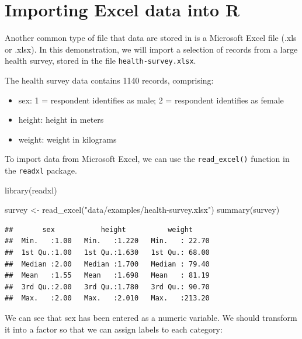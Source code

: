 \documentclass[
]{memoir}
\newenvironment{Shaded}{\begin{snugshade}}{\end{snugshade}}
\newcommand{\AttributeTok}[1]{\textcolor[rgb]{0.77,0.63,0.00}{#1}}
\newcommand{\DecValTok}[1]{\textcolor[rgb]{0.00,0.00,0.81}{#1}}
\newcommand{\FunctionTok}[1]{\textcolor[rgb]{0.00,0.00,0.00}{#1}}
\newcommand{\NormalTok}[1]{#1}
\newcommand{\OtherTok}[1]{\textcolor[rgb]{0.56,0.35,0.01}{#1}}
\newcommand{\SpecialCharTok}[1]{\textcolor[rgb]{0.00,0.00,0.00}{#1}}
\newcommand{\StringTok}[1]{\textcolor[rgb]{0.31,0.60,0.02}{#1}}
\providecommand{\tightlist}{%
  \setlength{\itemsep}{0pt}\setlength{\parskip}{0pt}}
\begin{document}
\hypertarget{import-excel}{%
\section{Importing Excel data into R}\label{import-excel}}

Another common type of file that data are stored in is a Microsoft Excel file (.xls or .xlsx). In this demonstration, we will import a selection of records from a large health survey, stored in the file \texttt{health-survey.xlsx}.

The health survey data contains 1140 records, comprising:

\begin{itemize}
\tightlist
\item
  sex: 1 = respondent identifies as male; 2 = respondent identifies as female
\item
  height: height in meters
\item
  weight: weight in kilograms
\end{itemize}

To import data from Microsoft Excel, we can use the \texttt{read\_excel()} function in the \texttt{readxl} package.

\begin{Shaded}
\begin{Highlighting}[]
\FunctionTok{library}\NormalTok{(readxl)}

\NormalTok{survey }\OtherTok{\textless{}{-}} \FunctionTok{read\_excel}\NormalTok{(}\StringTok{"data/examples/health{-}survey.xlsx"}\NormalTok{)}
\FunctionTok{summary}\NormalTok{(survey)}
\end{Highlighting}
\end{Shaded}

\begin{verbatim}
##       sex           height          weight      
##  Min.   :1.00   Min.   :1.220   Min.   : 22.70  
##  1st Qu.:1.00   1st Qu.:1.630   1st Qu.: 68.00  
##  Median :2.00   Median :1.700   Median : 79.40  
##  Mean   :1.55   Mean   :1.698   Mean   : 81.19  
##  3rd Qu.:2.00   3rd Qu.:1.780   3rd Qu.: 90.70  
##  Max.   :2.00   Max.   :2.010   Max.   :213.20
\end{verbatim}

We can see that sex has been entered as a numeric variable. We should transform it into a factor so that we can assign labels to each category:

\begin{Shaded}
\end{Shaded}
\end{document}

